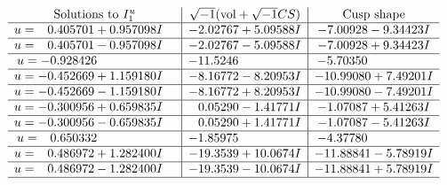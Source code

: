 \documentclass[1p]{elsarticle_modified}
\theoremstyle{definition}
\newcommand{\I}{\sqrt{-1}}
\begin{document}
$$\begin{array}{c|c|c}  
\text{Solutions to }I^u_{1}& \I (\text{vol} + \sqrt{-1}CS) & \text{Cusp shape}\\
 \hline 
\begin{aligned}
u &= \phantom{-}0.405701 + 0.957098 I\end{aligned}
 & -2.02767 + 5.09588 I & -7.00928 - 9.34423 I \\ \hline\begin{aligned}
u &= \phantom{-}0.405701 - 0.957098 I\end{aligned}
 & -2.02767 - 5.09588 I & -7.00928 + 9.34423 I \\ \hline\begin{aligned}
u &= -0.928426\phantom{ +0.000000I}\end{aligned}
 & -11.5246\phantom{ +0.000000I} & -5.70350\phantom{ +0.000000I} \\ \hline\begin{aligned}
u &= -0.452669 + 1.159180 I\end{aligned}
 & -8.16772 - 8.20953 I & -10.99080 + 7.49201 I \\ \hline\begin{aligned}
u &= -0.452669 - 1.159180 I\end{aligned}
 & -8.16772 + 8.20953 I & -10.99080 - 7.49201 I \\ \hline\begin{aligned}
u &= -0.300956 + 0.659835 I\end{aligned}
 & \phantom{-}0.05290 - 1.41771 I & -1.07087 + 5.41263 I \\ \hline\begin{aligned}
u &= -0.300956 - 0.659835 I\end{aligned}
 & \phantom{-}0.05290 + 1.41771 I & -1.07087 - 5.41263 I \\ \hline\begin{aligned}
u &= \phantom{-}0.650332\phantom{ +0.000000I}\end{aligned}
 & -1.85975\phantom{ +0.000000I} & -4.37780\phantom{ +0.000000I} \\ \hline\begin{aligned}
u &= \phantom{-}0.486972 + 1.282400 I\end{aligned}
 & -19.3539 + 10.0674 I & -11.88841 - 5.78919 I \\ \hline\begin{aligned}
u &= \phantom{-}0.486972 - 1.282400 I\end{aligned}
 & -19.3539 - 10.0674 I & -11.88841 + 5.78919 I\\
 \hline 
 \end{array}$$\newpage\newpage\renewcommand{\arraystretch}{1}
\end{document}
